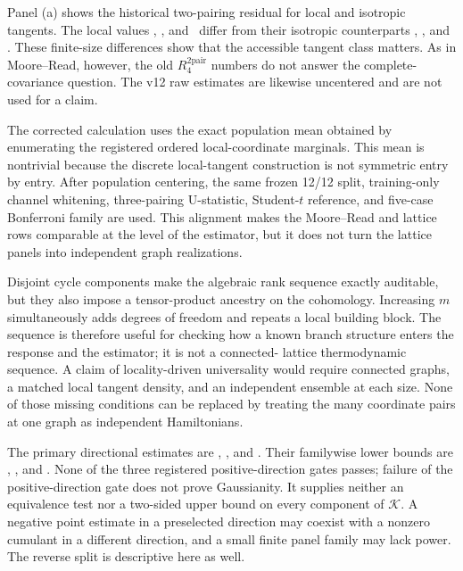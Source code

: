 Panel (a) shows the historical two-pairing residual for local and isotropic
tangents.  The local values
\LatticeSusyMOneLocalTwoPairRFour,
\LatticeSusyMTwoLocalTwoPairRFour, and
\LatticeSusyMThreeLocalTwoPairRFour\ differ from their isotropic counterparts
\LatticeSusyMOneIsotropicTwoPairRFour,
\LatticeSusyMTwoIsotropicTwoPairRFour, and
\LatticeSusyMThreeIsotropicTwoPairRFour.  These finite-size differences show
that the accessible tangent class matters.  As in Moore--Read, however, the
old $R_4^{2\mathrm{pair}}$ numbers do not answer the complete-covariance
question.  The v12 raw estimates are likewise uncentered and are not used for
a claim.

The corrected calculation uses the exact population mean obtained by
enumerating the registered ordered local-coordinate marginals.  This mean is
nontrivial because the discrete local-tangent construction is not symmetric
entry by entry.  After population centering, the same frozen 12/12 split,
training-only channel whitening, three-pairing U-statistic, Student-$t$
reference, and five-case Bonferroni family are used.  This alignment makes the
Moore--Read and lattice rows comparable at the level of the estimator, but it
does not turn the lattice panels into independent graph realizations.

Disjoint cycle components make the algebraic rank sequence exactly auditable,
but they also impose a tensor-product ancestry on the cohomology.  Increasing
$m$ simultaneously adds degrees of freedom and repeats a local building
block.  The sequence is therefore useful for checking how a known branch
structure enters the response and the estimator; it is not a connected-
lattice thermodynamic sequence.  A claim of locality-driven universality
would require connected graphs, a matched local tangent density, and an
independent ensemble at each size.  None of those missing conditions can be
replaced by treating the many coordinate pairs at one graph as independent
Hamiltonians.

The primary directional estimates are
\LatticeSusyMOneFullRFourDirectionalEstimate,
\LatticeSusyMTwoFullRFourDirectionalEstimate, and
\LatticeSusyMThreeFullRFourDirectionalEstimate.  Their familywise lower
bounds are \LatticeSusyMOneFullRFourFamilywiseLower,
\LatticeSusyMTwoFullRFourFamilywiseLower, and
\LatticeSusyMThreeFullRFourFamilywiseLower.  None of the three registered
positive-direction gates passes; failure of the positive-direction gate does
not prove Gaussianity.  It supplies neither an equivalence test nor a
two-sided upper bound on every component of $\mathcal K$.  A negative point
estimate in a preselected direction may coexist with a nonzero cumulant in a
different direction, and a small finite panel family may lack power.  The
reverse split is descriptive here as well.


